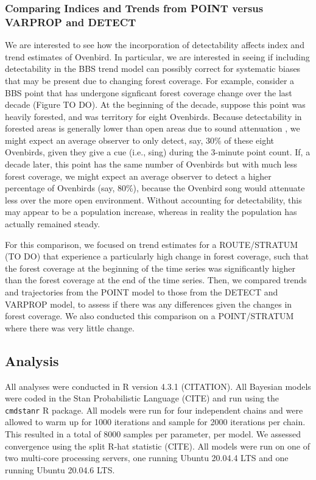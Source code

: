 \documentclass[12pt]{article}
\begin{document}
\subsubsection{Comparing Indices and Trends from POINT versus VARPROP and DETECT}

\par We are interested to see how the incorporation of detectability affects index and trend estimates of Ovenbird.
In particular, we are interested in seeing if including detectability in the BBS trend model can possibly correct for systematic biases that may be present due to changing forest coverage.
For example, consider a BBS point that has undergone signficant forest coverage change over the last decade (Figure TO DO).
At the beginning of the decade, suppose this point was heavily forested, and was territory for eight Ovenbirds. 
Because detectability in forested areas is generally lower than open areas due to sound attenuation \citep{yip_sound_2017}, we might expect an average observer to only detect, say, 30\% of these eight Ovenbirds, given they give a cue (i.e., sing) during the 3-minute point count.
If, a decade later, this point has the same number of Ovenbirds but with much less forest coverage, we might expect an average observer to detect a higher percentage of Ovenbirds (say, 80\%), because the Ovenbird song would attenuate less over the more open environment.
Without accounting for detectability, this may appear to be a population increase, whereas in reality the population has actually remained steady.

\par For this comparison, we focused on trend estimates for a ROUTE/STRATUM (TO DO) that experience a particularly high change in forest coverage, such that the forest coverage at the beginning of the time series was significantly higher than the forest coverage at the end of the time series.
Then, we compared trends and trajectories from the POINT model to those from the DETECT and VARPROP model, to assess if there was any differences given the changes in forest coverage.
We also conducted this comparison on a POINT/STRATUM where there was very little change.

\subsection{Analysis}
\par All analyses were conducted in R version 4.3.1 (CITATION).
All Bayesian models were coded in the Stan Probabilistic Language (CITE) and run using the \texttt{cmdstanr} R package.
All models were run for four independent chains and were allowed to warm up for 1000 iterations and sample for 2000 iterations per chain.
This resulted in a total of 8000 samples per parameter, per model.
We assessed convergence using the split R-hat statistic (CITE).
All models were run on one of two multi-core processing servers, one running Ubuntu 20.04.4 LTS and one running Ubuntu 20.04.6 LTS.
\end{document}
